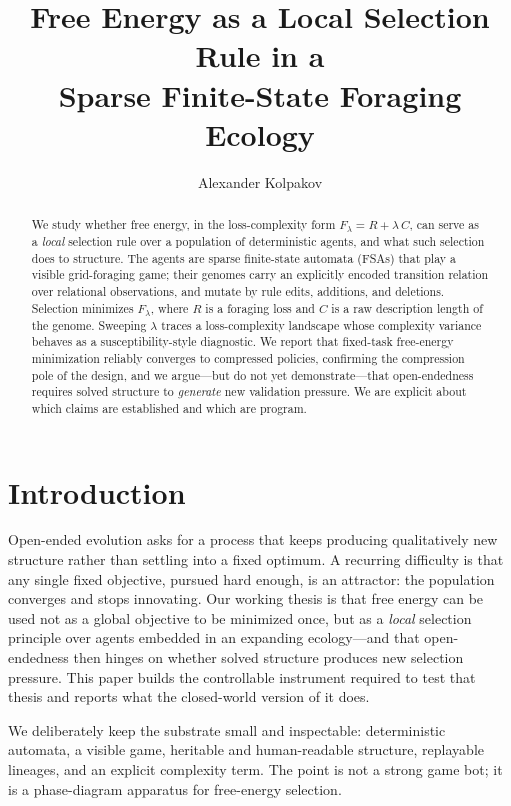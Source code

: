 \documentclass[11pt]{article}
\title{Free Energy as a Local Selection Rule in a\\ Sparse Finite-State Foraging Ecology}
\author{Alexander Kolpakov}
\date{}
\begin{document}
\maketitle

\begin{abstract}
We study whether free energy, in the loss-complexity form $F_\lambda = R + \lambda\,C$,
can serve as a \emph{local} selection rule over a population of deterministic agents,
and what such selection does to structure. The agents are sparse finite-state automata
(FSAs) that play a visible grid-foraging game; their genomes carry an explicitly
encoded transition relation over relational observations, and mutate by rule edits,
additions, and deletions. Selection minimizes $F_\lambda$, where $R$ is a foraging loss
and $C$ is a raw description length of the genome. Sweeping $\lambda$ traces a
loss-complexity landscape whose complexity variance behaves as a susceptibility-style
diagnostic. We report that fixed-task free-energy minimization reliably converges to
compressed policies, confirming the compression pole of the design, and we argue---but
do not yet demonstrate---that open-endedness requires solved structure to \emph{generate}
new validation pressure. We are explicit about which claims are established and which
are program.
\end{abstract}

\section{Introduction}
Open-ended evolution asks for a process that keeps producing qualitatively new structure
rather than settling into a fixed optimum. A recurring difficulty is that any single
fixed objective, pursued hard enough, is an attractor: the population converges and
stops innovating. Our working thesis is that free energy can be used not as a global
objective to be minimized once, but as a \emph{local} selection principle over agents
embedded in an expanding ecology---and that open-endedness then hinges on whether solved
structure produces new selection pressure. This paper builds the controllable instrument
required to test that thesis and reports what the closed-world version of it does.

We deliberately keep the substrate small and inspectable: deterministic automata, a
visible game, heritable and human-readable structure, replayable lineages, and an
explicit complexity term. The point is not a strong game bot; it is a phase-diagram
apparatus for free-energy selection.
\end{document}
